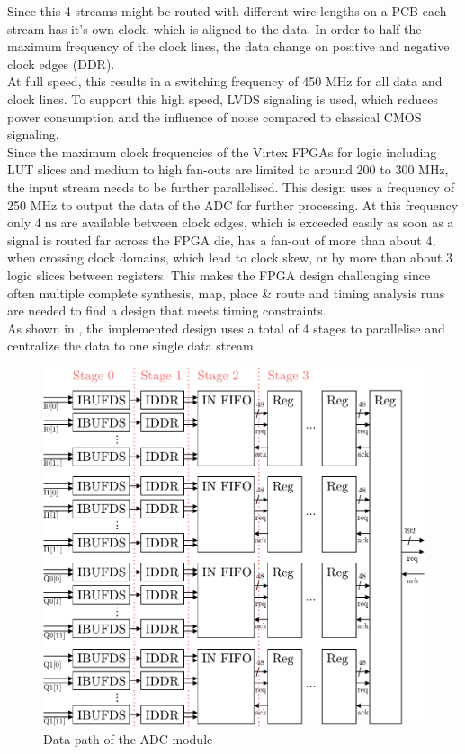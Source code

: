 Since this 4 streams might be routed with different wire lengths on a \gls{PCB}
each stream has it's own clock, which is aligned to the data.
In order to half the maximum frequency of the clock lines,
the data change on positive and negative clock edges (\gls{DDR}). \\

At full speed, this results in a switching frequency of 450 MHz for all data
and clock lines. To support this high speed, \gls{LVDS} signaling is used,
which reduces power consumption and the influence of noise
compared to classical \gls{CMOS} signaling. \\

Since the maximum clock frequencies of the Virtex \glspl{FPGA} for logic
including \gls{LUT} slices and medium to high fan-outs
are limited to around 200 to 300 MHz, the input stream needs to be further
parallelised. This design uses a frequency of 250 MHz to output
the data of the \gls{ADC} for further processing. At this frequency
only $4\;\text{ns}$ are available between clock edges, which is exceeded
easily as soon as a signal is routed far across the \gls{FPGA} die,
has a fan-out of more than about 4, when crossing clock domains, which lead
to clock skew, or by more than about 3 logic slices between registers.
This makes the \gls{FPGA} design challenging since often multiple
complete synthesis, map, place \& route and timing analysis runs are
needed to find a design that meets timing constraints. \\

As shown in , the implemented design uses
a total of 4 stages to parallelise and centralize the data to
one single data stream. \\

\begin{figure}[ht]
  \centering
  \includegraphics[width=\textwidth]{figures/fpga_adc}
  \caption{Data path of the \gls{ADC} module}
  \label{fig:fpga_adc}
\end{figure}

